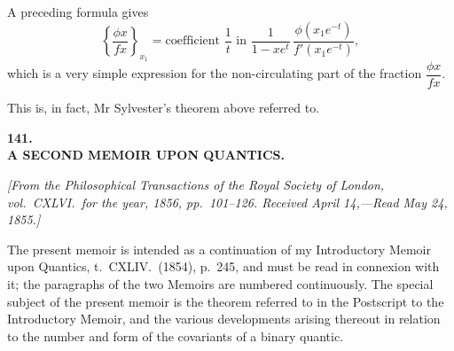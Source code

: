 \documentclass[11pt]{article}
\begin{document}
A preceding formula gives
\[
\left\{\frac{\phi x}{f x}\right\}_{x_1} = \text{coefficient } \frac{1}{t} \text{ in } \frac{1}{1 - x e^t}\,\frac{\phi(x_1 e^{-t})}{f'(x_1 e^{-t})},
\]
which is a very simple expression for the non-circulating part of the fraction $\dfrac{\phi x}{f x}$.

This is, in fact, Mr Sylvester's theorem above referred to.


\bigskip\bigskip
\begin{center}
{\Large\bfseries 141.}\\[1ex]
{\large\bfseries A SECOND MEMOIR UPON QUANTICS.}
\end{center}

\noindent\textit{[From the Philosophical Transactions of the Royal Society of London, vol.~CXLVI.\ for the year, 1856, pp.~101--126. Received April 14,---Read May 24, 1855.]}

\medskip

\noindent The present memoir is intended as a continuation of my Introductory Memoir upon Quantics, t.~CXLIV.\ (1854), p.~245, and must be read in connexion with it; the paragraphs of the two Memoirs are numbered continuously. The special subject of the present memoir is the theorem referred to in the Postscript to the Introductory Memoir, and the various developments arising thereout in relation to the number and form of the covariants of a binary quantic.
\end{document}
